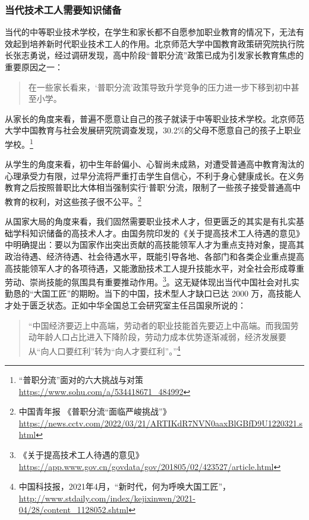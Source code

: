 \documentclass[12pt,UTF8]{ctexart}
\begin{document}
\subsubsection {当代技术工人需要知识储备}
\par {
	
	当代的中等职业技术学校，在学生和家长都不自愿参加职业教育的情况下，无法有效起到培养新时代职业技术工人的作用。北京师范大学中国教育政策研究院执行院长张志勇说，经过调研发现，高中阶段“普职分流”政策已成为引发家长教育焦虑的重要原因之一：
	\begin{quote}
		\kaishu 在一些家长看来，‘普职分流’政策导致升学竞争的压力进一步下移到初中甚至小学。
	\end{quote}
}
\par {
	
	从家长的角度来看，普遍不愿意让自己的孩子就读于中等职业技术学校。北京师范大学中国教育与社会发展研究院调查发现，30.2\%的父母不愿意自己的孩子上职业学校。\footnote{“普职分流”面对的六大挑战与对策
		\url{https://www.sohu.com/a/534418671_484992}}
}
\par {
	
	从学生的角度来看，初中生年龄偏小、心智尚未成熟，对遭受普通高中教育淘汰的心理承受力有限，过早分流将严重打击学生自信心，不利于身心健康成长。在义务教育之后按照普职比大体相当强制实行‘普职’分流，限制了一些孩子接受普通高中教育的权利，对这些孩子很不公平。\footnote{中国青年报
		《普职分流“面临严峻挑战”》\url{https://news.cctv.com/2022/03/21/ARTIKdR7NVN0aaxBlGBfD9U1220321.shtml}}
}
\par {
	
	从国家大局的角度来看，我们固然需要职业技术人才，但更匮乏的其实是有扎实基础学科知识储备的高技术人才。由国务院印发的《关于提高技术工人待遇的意见》中明确提出：要以为国家作出突出贡献的高技能领军人才为重点支持对象，提高其政治待遇、经济待遇、社会待遇水平，既能引导各地、各部门和各类企业重点提高高技能领军人才的各项待遇，又能激励技术工人提升技能水平，对全社会形成尊重劳动、崇尚技能的氛围具有重要推动作用。\footnote{《关于提高技术工人待遇的意见》\url{https://app.www.gov.cn/govdata/gov/201805/02/423527/article.html}}。这无疑体现出当代中国社会对扎实勤恳的“大国工匠”的期盼。当下的中国，技术型人才缺口已达
	2000 万，高技能人才处于匮乏状态。正如中华全国总工会研究室主任吕国泉所说的：
	\begin{quote}
		\kaishu
		“中国经济要迈上中高端，劳动者的职业技能首先要迈上中高端。而我国劳动年龄人口占比进入下降阶段，劳动力成本优势逐渐减弱，经济发展要从“向人口要红利”转为“向人才要红利”。”\footnote{中国科技报，2021年4月，“新时代，何为呼唤大国工匠”，\url{http://www.stdaily.com/index/kejixinwen/2021-04/28/content_1128052.shtml}}
	\end{quote}
}
\end{document}
